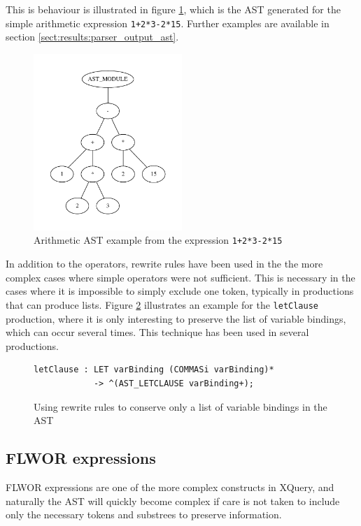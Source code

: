 This is behaviour is illustrated in figure \ref{tree:ast:arithmetic}, which is
the AST generated for the simple arithmetic expression \verb!1+2*3-2*15!.
Further examples are available in section \ref{sect:results:parser_output_ast}.

\begin{figure}[h!]
\centering
 \includegraphics[width=0.5\textwidth]{img/graphs/arithmetic1}
\caption{Arithmetic AST example from the expression \texttt{1+2*3-2*15}}
\label{tree:ast:arithmetic}
\end{figure}

In addition to the operators, rewrite rules have been used in the the more
complex cases where simple operators were not sufficient. This is necessary in
the cases where it is impossible to simply exclude one token, typically in
productions that can produce lists. Figure \ref{code:ast:rewritelist}
illustrates an example for the \verb!letClause! production, where it is only
interesting to preserve the list of variable bindings, which can occur several
times. This technique has been used in several productions.

\begin{figure}[h!]
\begin{verbatim}
letClause : LET varBinding (COMMASi varBinding)*
            -> ^(AST_LETCLAUSE varBinding+);
\end{verbatim}
\caption[AST rewrite rule for the \texttt{letClause} production rule]{Using
rewrite rules to conserve only a list of variable bindings in the AST}
\label{code:ast:rewritelist}
\end{figure}

\subsection{FLWOR expressions}
FLWOR expressions are one of the more complex constructs in XQuery, and
naturally the AST will quickly become complex if care is not taken to include
only the necessary tokens and substrees to preserve information.

